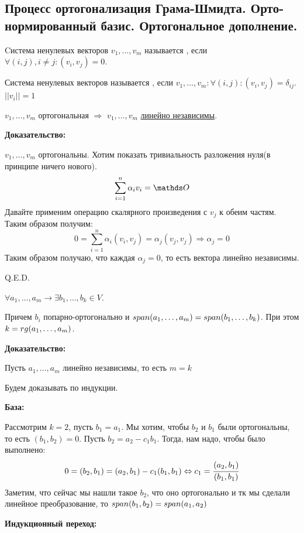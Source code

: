 \pagebreak
\subsection{Процесс ортогонализация Грама-Шмидта. Орто-нормированный базис. Ортогональное дополнение.}

 Cистема ненулевых векторов $v_1,\ldots, v_m$ называется , если $\forall (i,j), i\neq j: (v_i,v_j) =0$.  



 Система ненулевых векторов называется , если $v_1,\ldots, v_m: \forall (i,j): (v_i,v_j) = \delta_{ij}$. $||v_i||= 1$

 $v_1,\ldots, v_m$ ортогональная $\Rightarrow$ $v_1,\ldots , v_m$ \uline{линейно независимы}.

\textbf{Доказательство:}

$v_1,\ldots, v_m$ ортогональны. Хотим показать тривиальность разложения нуля(в принципе ничего нового).
$$\sum\limits_{i=1}^n \alpha_i v_i =\zero$$
Давайте применим операцию скалярного произведения с $v_j$ к обеим частям. Таким образом получим:
$$0 = \sum\limits_{i=1}^n \alpha_i (v_i,v_j)= \alpha_j (v_j,v_j) \Rightarrow \alpha_j =0$$ 
Таким образом получаю, что каждая $\alpha_j = 0$, то есть вектора линейно независимы.

\hfill Q.E.D.



$\forall a_1,\ldots,a_m \rightarrow \exists b_1,\ldots,b_k \in V$.

Причем $b_i$ попарно-ортогонально и $span (a_1,\ldots, a_m) = span(b_1,\ldots,b_k)$. При этом $k = rg (a_1,\ldots,a_m)$.

\textbf{Доказательство:}

Пусть $a_1,\ldots,a_m$ линейно независимы, то есть $m=k$

Будем доказывать по индукции.

\textbf{База:}

Рассмотрим $k=2$, пусть $b_1 = a_1$. Мы хотим, чтобы $b_2$ и $b_1$ были ортогональны, то есть $(b_1,b_2) = 0$. Пусть $b_2 = a_2 - c_1 b_1$. Тогда, нам надо, чтобы было выполнено:
$$0 = (b_2,b_1) = (a_2,b_1)-c_1(b_1,b_1) \Leftrightarrow c_1 = \cfrac{(a_2,b_1)}{(b_1,b_1)}$$
Заметим, что сейчас мы нашли такое $b_2$, что оно ортогонально и тк мы сделали линейное преобразование, то $span (b_1,b_2) = span (a_1,a_2)$

\textbf{Индукционный переход:}

